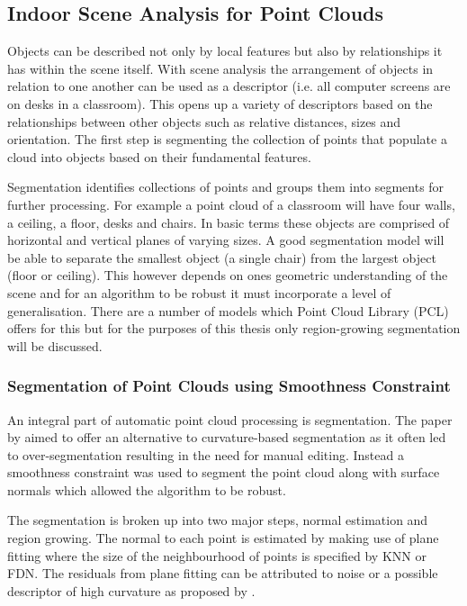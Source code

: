 \subsection{Indoor Scene Analysis for Point Clouds \label{indoor_scene_analysis}}
Objects can be described not only by local features but also by relationships it has within the scene itself. With scene analysis the arrangement of objects in relation to one another can be used as a descriptor (i.e. all computer screens are on desks in a classroom). This opens up a variety of descriptors based on the relationships between other objects such as relative distances, sizes and orientation. The first step is segmenting the collection of points that populate a cloud into objects based on their fundamental features.

Segmentation identifies collections of points and groups them into segments for further processing. For example a point cloud of a classroom will have four walls, a ceiling, a floor, desks and chairs. In basic terms these objects are comprised of horizontal and vertical planes of varying sizes. A good segmentation model will be able to separate the smallest object (a single chair) from the largest object (floor or ceiling). This however depends on ones geometric understanding of the scene and for an algorithm to be robust it must incorporate a level of generalisation.  There are a number of models which Point Cloud Library (PCL) offers for this but for the purposes of this thesis only region-growing segmentation will be discussed.

\subsubsection*{Segmentation of Point Clouds using Smoothness Constraint \label{Smoothness}}
An integral part of automatic point cloud processing is segmentation. The paper by \citet{rabbani_segmentation_2006} aimed to offer an alternative to curvature-based segmentation as it often led to over-segmentation resulting in the need for manual editing. Instead a smoothness constraint was used to segment the point cloud along with surface normals which allowed the algorithm to be robust. 

The segmentation is broken up into two major steps, normal estimation and region growing. The normal to each point is estimated by making use of plane fitting where the size of the neighbourhood of points is specified by KNN or FDN. The residuals from plane fitting can be attributed to noise or a possible descriptor of high curvature as proposed by \citet{rabbani_segmentation_2006}.

